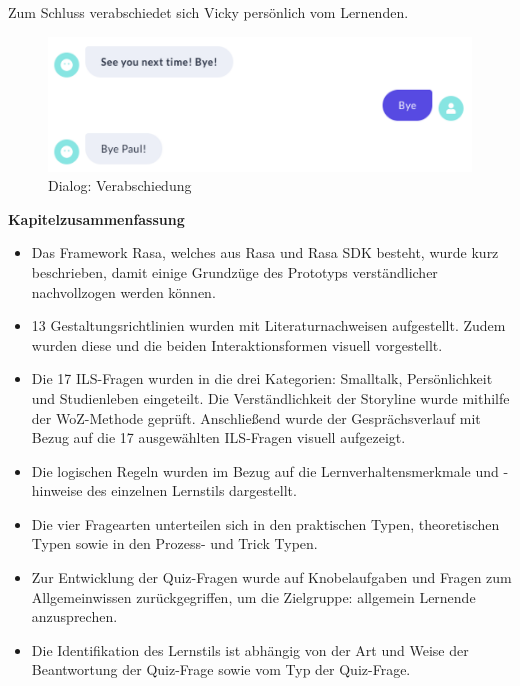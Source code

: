 Zum Schluss verabschiedet sich Vicky persönlich vom Lernenden.
\begin{figure}[H]
  \centering
  \includegraphics[width=0.7\linewidth]{images/VickyQuiz/Q18.png}
  \caption[Dialog: Verabschiedung]{Dialog: Verabschiedung}
  \label{fig:Verabschiedung}
\end{figure} 

\textbf{Kapitelzusammenfassung} 
\begin{itemize}
  \item Das Framework Rasa, welches aus Rasa und Rasa SDK besteht, wurde kurz beschrieben, damit einige Grundzüge des Prototyps verständlicher nachvollzogen werden können.
  \item 13 Gestaltungsrichtlinien wurden mit Literaturnachweisen aufgestellt. Zudem wurden diese und die beiden Interaktionsformen visuell vorgestellt.
  \item Die 17 ILS-Fragen wurden in die drei Kategorien: Smalltalk, Persönlichkeit und Studienleben eingeteilt. Die Verständlichkeit der Storyline wurde mithilfe der WoZ-Methode geprüft. Anschließend wurde der Gesprächsverlauf mit Bezug auf die 17 ausgewählten ILS-Fragen  visuell aufgezeigt.
  \item Die logischen Regeln wurden im Bezug auf die Lernverhaltensmerkmale und -hinweise des einzelnen Lernstils dargestellt.
  \item Die vier Fragearten unterteilen sich in den praktischen Typen, theoretischen Typen sowie in den Prozess- und Trick Typen.
  \item Zur Entwicklung der Quiz-Fragen wurde auf Knobelaufgaben und Fragen zum Allgemeinwissen zurückgegriffen, um die Zielgruppe: allgemein Lernende anzusprechen.
  \item Die Identifikation des Lernstils ist abhängig von der Art und Weise der Beantwortung der Quiz-Frage sowie vom Typ der Quiz-Frage.
\end{itemize}
  
